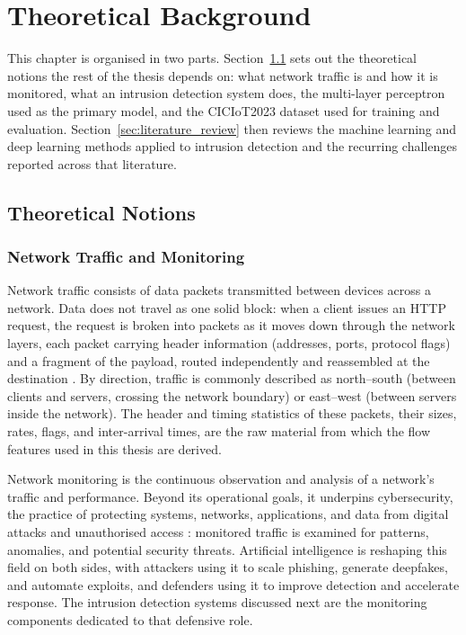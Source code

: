 \chapter{Theoretical Background}
\label{chap:theoretical_background}

\par This chapter is organised in two parts. Section~\ref{sec:theoretical_notions} sets out the theoretical notions the rest of the thesis depends on: what network traffic is and how it is monitored, what an intrusion detection system does, the multi-layer perceptron used as the primary model, and the CICIoT2023 dataset used for training and evaluation. Section~\ref{sec:literature_review} then reviews the machine learning and deep learning methods applied to intrusion detection and the recurring challenges reported across that literature.

\section{Theoretical Notions}
\label{sec:theoretical_notions}

\subsection{Network Traffic and Monitoring}
\label{sec:network_traffic}

\par Network traffic consists of data packets transmitted between devices across a network. Data does not travel as one solid block: when a client issues an HTTP request, the request is broken into packets as it moves down through the network layers, each packet carrying header information (addresses, ports, protocol flags) and a fragment of the payload, routed independently and reassembled at the destination \cite{CloudflarePacket}. By direction, traffic is commonly described as north--south (between clients and servers, crossing the network boundary) or east--west (between servers inside the network). The header and timing statistics of these packets, their sizes, rates, flags, and inter-arrival times, are the raw material from which the flow features used in this thesis are derived.

\par Network monitoring is the continuous observation and analysis of a network's traffic and performance. Beyond its operational goals, it underpins cybersecurity, the practice of protecting systems, networks, applications, and data from digital attacks and unauthorised access \cite{FortinetCybersecurity}: monitored traffic is examined for patterns, anomalies, and potential security threats. Artificial intelligence is reshaping this field on both sides, with attackers using it to scale phishing, generate deepfakes, and automate exploits, and defenders using it to improve detection and accelerate response. The intrusion detection systems discussed next are the monitoring components dedicated to that defensive role.

